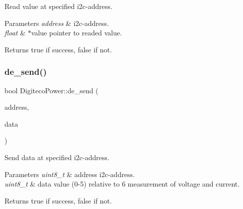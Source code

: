 Read value at specified i2c-\/address. 


\begin{DoxyParams}{Parameters}
{\em address} & i2c-\/address. \\
\hline
{\em float} & $\ast$value pointer to readed value. \\
\hline
\end{DoxyParams}
\begin{DoxyReturn}{Returns}
true if success, false if not. 
\end{DoxyReturn}
\mbox{\label{namespaceDigitecoPower_a2a1d64ce6df863e91fef034a496220fd}} 
\subsubsection{\texorpdfstring{de\+\_\+send()}{de\_send()}}
{\footnotesize\ttfamily bool Digiteco\+Power\+::de\+\_\+send (\begin{DoxyParamCaption}\item[{uint8\+\_\+t}]{address,  }\item[{uint8\+\_\+t}]{data }\end{DoxyParamCaption})}



Send data at specified i2c-\/address. 


\begin{DoxyParams}{Parameters}
{\em uint8\+\_\+t} & address i2c-\/address. \\
\hline
{\em uint8\+\_\+t} & data value (0-\/5) relative to 6 measurement of voltage and current. \\
\hline
\end{DoxyParams}
\begin{DoxyReturn}{Returns}
true if success, false if not. 
\end{DoxyReturn}
